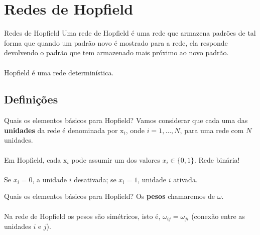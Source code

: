 \section{Redes de Hopfield}

\begin{frame}{Redes de Hopfield}%
  \justifying%
  Uma rede de Hopfield é uma rede que armazena padrões de tal forma que quando um padrão novo é mostrado para a rede, ela responde devolvendo o padrão que tem armazenado mais próximo ao novo padrão.
  \\~\\
  Hopfield é uma rede determinística.
\end{frame}

\subsection{Definições}
\begin{frame}{Quais os elementos básicos para Hopfield?}%
  \justifying%
  Vamos considerar que cada uma das \textbf{unidades} da rede é denominada por $\mathrm{x}_{i}$, onde $i = 1, \dots, N$, para uma rede com $N$ unidades.
  \\~\\
  Em Hopfield, cada $\mathrm{x}_{i}$ pode assumir um dos valores $x_{i} \in \{0, 1\}$. Rede binária!
  \\~\\
  Se $x_{i} = 0$, a unidade $i$ desativada; se $x_{i} = 1$, unidade $i$ ativada.
\end{frame}

\begin{frame}{Quais os elementos básicos para Hopfield?}%
  \justifying%
  Os \textbf{pesos} chamaremos de $\omega$.
  \\~\\
  Na rede de Hopfield os pesos são simétricos, isto é, $\omega_{ij} = \omega_{ji}$ (conexão entre as unidades $i$ e $j$).
\end{frame}

